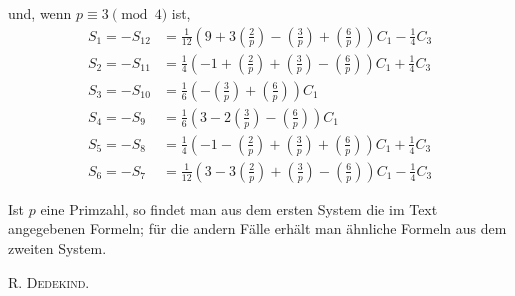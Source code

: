 und, wenn $p\equiv3\pmod4$ ist,
\[
\begin{aligned}
S_1=-S_{12}&=\tfrac1{12}\left(9+3\left(\frac2p\right)-\left(\frac3p\right)+\left(\frac6p\right)\right)C_1-\tfrac14C_3\\
S_2=-S_{11}&=\tfrac14\left(-1+\left(\frac2p\right)+\left(\frac3p\right)-\left(\frac6p\right)\right)C_1+\tfrac14C_3\\
S_3=-S_{10}&=\tfrac16\left(-\left(\frac3p\right)+\left(\frac6p\right)\right)C_1\\
S_4=-S_9&=\tfrac16\left(3-2\left(\frac3p\right)-\left(\frac6p\right)\right)C_1\\
S_5=-S_8&=\tfrac14\left(-1-\left(\frac2p\right)+\left(\frac3p\right)+\left(\frac6p\right)\right)C_1+\tfrac14C_3\\
S_6=-S_7&=\tfrac1{12}\left(3-3\left(\frac2p\right)+\left(\frac3p\right)-\left(\frac6p\right)\right)C_1-\tfrac14C_3
\end{aligned}
\]

Ist $p$ eine Primzahl, so findet man aus dem ersten System die im Text angegebenen Formeln; für die andern Fälle erhält man ähnliche Formeln aus dem zweiten System.
\begin{flushright}\textsc{R. Dedekind.}\end{flushright}
\BookRule{55mm}
